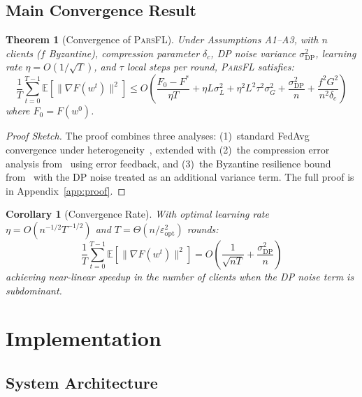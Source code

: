 \documentclass[11pt,a4paper]{article}
\newcommand{\parsfl}{\textsc{ParsFL}\xspace}
\newcommand{\EE}{\mathbb{E}}
\newtheorem{theorem}{Theorem}
\newtheorem{corollary}{Corollary}
\begin{document}
\subsection{Main Convergence Result}

\begin{theorem}[Convergence of \parsfl]
\label{thm:convergence}
Under Assumptions A1--A3, with $n$ clients ($f$ Byzantine), compression parameter $\delta_c$, DP noise variance $\sigma_{\text{DP}}^2$, learning rate $\eta = O(1/\sqrt{T})$, and $\tau$ local steps per round, \parsfl satisfies:
\begin{equation}
    \frac{1}{T} \sum_{t=0}^{T-1} \EE[\|\nabla F(w^t)\|^2] \leq O\left(\frac{F_0 - F^*}{\eta T} + \eta L \sigma_L^2 + \eta^2 L^2 \tau^2 \sigma_G^2 + \frac{\sigma_{\text{DP}}^2}{n} + \frac{f^2 G^2}{n^2 \delta_c}\right)
\end{equation}
where $F_0 = F(w^0)$.
\end{theorem}

\begin{proof}[Proof Sketch]
The proof combines three analyses: (1)~standard FedAvg convergence under heterogeneity~\citep{li2020federated}, extended with (2)~the compression error analysis from~\citep{stich2018sparsified} using error feedback, and (3)~the Byzantine resilience bound from~\citep{yin2018byzantine} with the DP noise treated as an additional variance term. The full proof is in Appendix~\ref{app:proof}.
\end{proof}

\begin{corollary}[Convergence Rate]
With optimal learning rate $\eta = O(n^{-1/2} T^{-1/2})$ and $T = \Theta(n/\varepsilon_{\text{opt}}^2)$ rounds:
\begin{equation}
    \frac{1}{T} \sum_{t=0}^{T-1} \EE[\|\nabla F(w^t)\|^2] = O\left(\frac{1}{\sqrt{nT}} + \frac{\sigma_{\text{DP}}^2}{n}\right)
\end{equation}
achieving near-linear speedup in the number of clients when the DP noise term is subdominant.
\end{corollary}

\section{Implementation}

\subsection{System Architecture}
\end{document}
